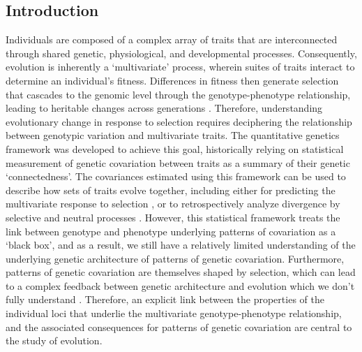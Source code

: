 \begin{refsection}

\section{Introduction}

Individuals are composed of a complex array of traits that are
interconnected through shared genetic, physiological, and developmental
processes. Consequently, evolution is inherently a `multivariate'
process, wherein suites of traits interact to determine an individual's
fitness. Differences in fitness then generate selection that cascades to the genomic level
through the genotype-phenotype relationship, leading to heritable changes
across generations \parencite{Lande1983-ez,Klingenberg2008-ll,Melo2016-yw}.
Therefore, understanding evolutionary change in response to selection requires deciphering
the relationship between genotypic variation and multivariate traits. The
quantitative genetics framework was developed to achieve this goal,
historically relying on statistical measurement of genetic covariation
between traits as a summary of their genetic `connectedness'. The
covariances estimated using this framework can be used to describe how
sets of traits evolve together, including either for predicting
the multivariate response to selection \parencite{Lande1979-by}, or to
retrospectively analyze divergence by selective and neutral processes
\parencite{Felsenstein1988-ql}. However,
this statistical framework treats the link between genotype and
phenotype underlying patterns of covariation as a `black box', and as a
result, we still have a relatively limited understanding of the
underlying genetic architecture of patterns of genetic covariation.
Furthermore, patterns of genetic covariation are themselves shaped by
selection, which can lead to a complex feedback between genetic
architecture and evolution which we don't fully understand
\parencite{Turelli1994-pg,Jones2004-be,Jones2014-wj}. Therefore, an explicit
link between the properties of the individual loci that underlie the
multivariate genotype-phenotype relationship, and the associated
consequences for patterns of genetic covariation are central to the
study of evolution.


\end{refsection}
